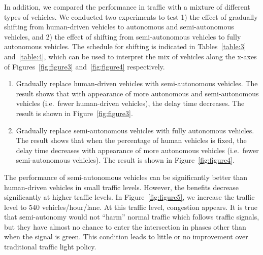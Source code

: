 
In addition, we compared the performance in traffic with a mixture of
different types of vehicles.  We conducted two experiments to test 1)
the effect of gradually shifting from human-driven vehicles to
autonomous and semi-autonomous vehicles, and 2) the effect of shifting
from semi-autonomous vehicles to fully autonomous vehicles.  The
schedule for shifting is indicated in Tables~\ref{table:3}
and~\ref{table:4}, which can be used to interpret the mix of vehicles
along the x-axes of Figures~\ref{fig:figure3} and~\ref{fig:figure4}
respectively.

\begin{enumerate}

\item Gradually replace human-driven vehicles with semi-autonomous
  vehicles. The result shows that with appearance of more autonomous
  and semi-autonomous vehicles (i.e.\ fewer human-driven vehicles), the
  delay time decreases. The result is shown in
  Figure~\ref{fig:figure3}.

\item Gradually replace semi-autonomous vehicles with fully autonomous
  vehicles. The result shows that when the percentage of human
  vehicles is fixed, the delay time decreases with appearance
  of more autonomous vehicles (i.e.\ fewer semi-autonomous vehicles).
  The result is shown in Figure~\ref{fig:figure4}.

\end{enumerate}

The performance of semi-autonomous vehicles can be significantly
better than human-driven vehicles in small traffic levels. However,
the benefits decrease significantly at higher traffic levels.  In
Figure~\ref{fig:figure5}, we increase the traffic level to 540
vehicles/hour/lane. At this traffic level, congestion appears.  It is
true that semi-autonomy would not ``harm'' normal traffic which
follows traffic signals, but they have almost no chance to enter the
intersection in phases other than when the signal is green. This
condition leads to little or no improvement over traditional traffic
light policy.

